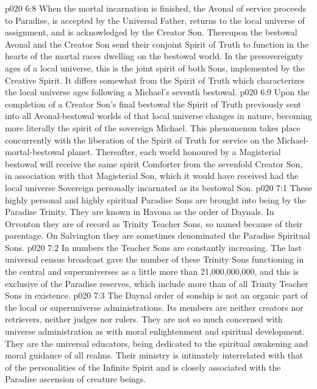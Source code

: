 \vs p020 6:8 When the mortal incarnation is finished, the Avonal of service proceeds to Paradise, is accepted by the Universal Father, returns to the local universe of assignment, and is acknowledged by the Creator Son. Thereupon the bestowal Avonal and the Creator Son send their conjoint Spirit of Truth to function in the hearts of the mortal races dwelling on the bestowal world. In the presovereignty ages of a local universe, this is the joint spirit of both Sons, implemented by the Creative Spirit. It differs somewhat from the Spirit of Truth which characterizes the local universe ages following a Michael’s seventh bestowal.
\vs p020 6:9 Upon the completion of a Creator Son’s final bestowal the Spirit of Truth previously sent into all Avonal\hyp{}bestowal worlds of that local universe changes in nature, becoming more literally the spirit of the sovereign Michael. This phenomenon takes place concurrently with the liberation of the Spirit of Truth for service on the Michael\hyp{}mortal\hyp{}bestowal planet. Thereafter, each world honoured by a Magisterial bestowal will receive the same spirit Comforter from the sevenfold Creator Son, in association with that Magisterial Son, which it would have received had the local universe Sovereign personally incarnated as its bestowal Son.
\vs p020 7:1 These highly personal and highly spiritual Paradise Sons are brought into being by the Paradise Trinity. They are known in Havona as the order of Daynals. In Orvonton they are of record as Trinity Teacher Sons, so named because of their parentage. On Salvington they are sometimes denominated the Paradise Spiritual Sons.
\vs p020 7:2 In numbers the Teacher Sons are constantly increasing. The last universal census broadcast gave the number of these Trinity Sons functioning in the central and superuniverses as a little more than 21,000,000,000, and this is exclusive of the Paradise reserves, which include more than  of all Trinity Teacher Sons in existence.
\vs p020 7:3 The Daynal order of sonship is not an organic part of the local or superuniverse administrations. Its members are neither creators nor retrievers, neither judges nor rulers. They are not so much concerned with universe administration as with moral enlightenment and spiritual development. They are the universal educators, being dedicated to the spiritual awakening and moral guidance of all realms. Their ministry is intimately interrelated with that of the personalities of the Infinite Spirit and is closely associated with the Paradise ascension of creature beings.
